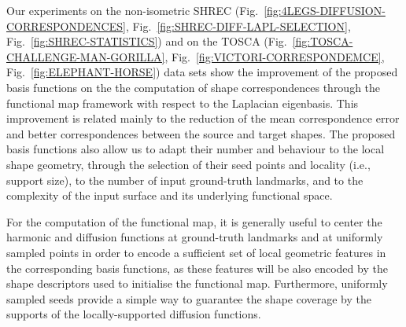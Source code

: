 \documentclass[acmtog,authorversion]{acmart}
\begin{document}
Our experiments on the non-isometric SHREC (Fig.~\ref{fig:4LEGS-DIFFUSION-CORRESPONDENCES}, Fig.~\ref{fig:SHREC-DIFF-LAPL-SELECTION}, Fig.~\ref{fig:SHREC-STATISTICS}) and on the TOSCA (Fig.~\ref{fig:TOSCA-CHALLENGE-MAN-GORILLA}, Fig.~\ref{fig:VICTORI-CORRESPONDEMCE}, Fig.~\ref{fig:ELEPHANT-HORSE}) data sets show the improvement of the proposed basis functions on the the computation of shape correspondences through the functional map framework with respect to the Laplacian eigenbasis. This improvement is related mainly to the reduction of the mean correspondence error and better correspondences between the source and target shapes. The proposed basis functions also allow us to adapt their number and behaviour to the local shape geometry, through the selection of their seed points and locality (i.e., support size), to the number of input ground-truth landmarks, and to the complexity of the input surface and its underlying functional space.

For the computation of the functional map, it is generally useful to center the harmonic and diffusion functions at ground-truth landmarks and at uniformly sampled points in order to encode a sufficient set of local geometric features in the corresponding basis functions, as these features will be also encoded by the shape descriptors used to initialise the functional map. Furthermore, uniformly sampled seeds provide a simple way to guarantee the shape coverage by the supports of the locally-supported diffusion functions.
\end{document}
